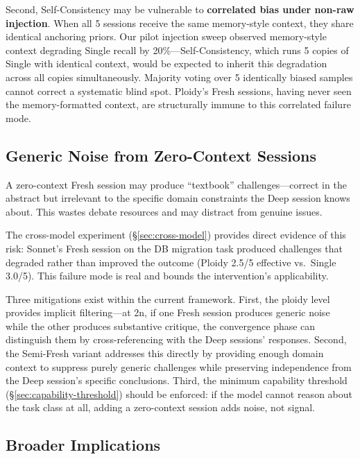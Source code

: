 \documentclass[11pt]{article}
\begin{document}
Second, Self-Consistency may be vulnerable to \textbf{correlated bias under non-raw injection}. When all 5 sessions receive the same memory-style context, they share identical anchoring priors. Our pilot injection sweep observed memory-style context degrading Single recall by 20\%---Self-Consistency, which runs 5 copies of Single with identical context, would be expected to inherit this degradation across all copies simultaneously. Majority voting over 5 identically biased samples cannot correct a systematic blind spot. Ploidy's Fresh sessions, having never seen the memory-formatted context, are structurally immune to this correlated failure mode.

\subsection{Generic Noise from Zero-Context Sessions}
\label{sec:generic-noise}

A zero-context Fresh session may produce ``textbook'' challenges---correct in the abstract but irrelevant to the specific domain constraints the Deep session knows about. This wastes debate resources and may distract from genuine issues.

The cross-model experiment (\S\ref{sec:cross-model}) provides direct evidence of this risk: Sonnet's Fresh session on the DB migration task produced challenges that degraded rather than improved the outcome (Ploidy 2.5/5 effective vs.\ Single 3.0/5). This failure mode is real and bounds the intervention's applicability.

Three mitigations exist within the current framework. First, the ploidy level provides implicit filtering---at 2n, if one Fresh session produces generic noise while the other produces substantive critique, the convergence phase can distinguish them by cross-referencing with the Deep sessions' responses. Second, the Semi-Fresh variant addresses this directly by providing enough domain context to suppress purely generic challenges while preserving independence from the Deep session's specific conclusions. Third, the minimum capability threshold (\S\ref{sec:capability-threshold}) should be enforced: if the model cannot reason about the task class at all, adding a zero-context session adds noise, not signal.

\subsection{Broader Implications}
\label{sec:implications}
\end{document}
